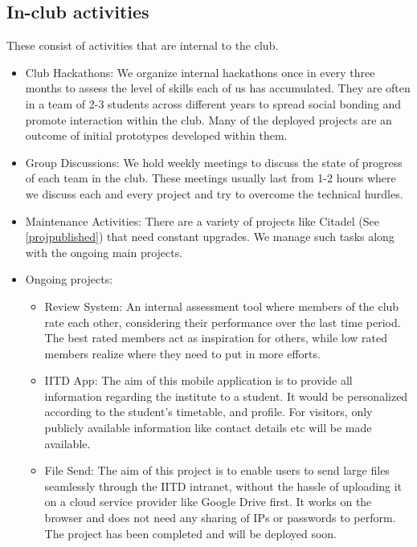 \documentclass[11pt,a4paper]{article}
\begin{document}
    \subsection{In-club activities}
    These consist of activities that are internal to the club.
    \begin{itemize}
        \item Club Hackathons: We organize internal hackathons once in every three months to assess the level of skills each of us has accumulated. They are often in a team of 2-3 students across different years to spread social bonding and promote interaction within the club. Many of the deployed projects are an outcome of initial prototypes developed within them.
        \item Group Discussions: We hold weekly meetings to discuss the state of progress of each team in the club. These meetings usually last from 1-2 hours where we discuss each and every project and try to overcome the technical hurdles.
        \item Maintenance Activities: There are a variety of projects like Citadel (See \ref{projpublished}) that need constant upgrades. We manage such tasks along with the ongoing main projects.
        \item Ongoing projects:
        \begin{itemize}
                \item Review System: An internal assessment tool where members of the club rate each other, considering their performance over the last time period. The best rated members act as inspiration for others, while low rated members realize where they need to put in more efforts.
            
            \item IITD App: The aim of this mobile application is to provide all information regarding the institute to a student. It would be personalized according to the student's timetable, and profile. For visitors, only publicly available information like contact details etc will be made available.
            
            \item File Send: The aim of this project is to enable users to send large files seamlessly through the IITD intranet, without the hassle of uploading it on a cloud service provider like Google Drive first. It works on the browser and does not need any sharing of IPs or passwords to perform. The project has been completed and will be deployed soon.
            

\end{itemize}
\end{itemize}
\end{document}
